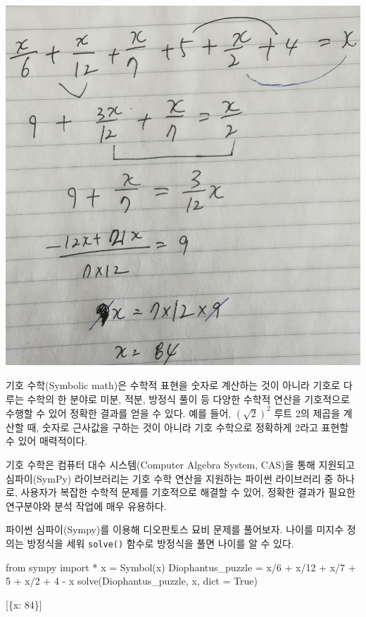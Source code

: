 \documentclass[
  letterpaper,
]{book}
\newenvironment{Shaded}{\begin{snugshade}}{\end{snugshade}}
\newcommand{\BuiltInTok}[1]{\textcolor[rgb]{0.00,0.23,0.31}{#1}}
\newcommand{\DecValTok}[1]{\textcolor[rgb]{0.68,0.00,0.00}{#1}}
\newcommand{\ImportTok}[1]{\textcolor[rgb]{0.00,0.46,0.62}{#1}}
\newcommand{\NormalTok}[1]{\textcolor[rgb]{0.00,0.23,0.31}{#1}}
\newcommand{\OperatorTok}[1]{\textcolor[rgb]{0.37,0.37,0.37}{#1}}
\newcommand{\StringTok}[1]{\textcolor[rgb]{0.13,0.47,0.30}{#1}}
\newcommand{\VariableTok}[1]{\textcolor[rgb]{0.07,0.07,0.07}{#1}}
\begin{document}
\includegraphics{images/inference_hand.jpg}

기호 수학(Symbolic math)은 수학적 표현을 숫자로 계산하는 것이 아니라
기호로 다루는 수학의 한 분야로 미분, 적분, 방정식 풀이 등 다양한 수학적
연산을 기호적으로 수행할 수 있어 정확한 결과를 얻을 수 있다. 예를 들어,
\((\sqrt{2})^2\) 루트 2의 제곱을 계산할 때, 숫자로 근사값을 구하는 것이
아니라 기호 수학으로 정확하게 2라고 표현할 수 있어 매력적이다.

기호 수학은 컴퓨터 대수 시스템(Computer Algebra System, CAS)을 통해
지원되고 심파이(SymPy) 라이브러리는 기호 수학 연산을 지원하는 파이썬
라이브러리 중 하나로, 사용자가 복잡한 수학적 문제를 기호적으로 해결할 수
있어, 정확한 결과가 필요한 연구분야와 분석 작업에 매우 유용하다.

파이썬 심파이(Sympy)를 이용해 디오판토스 묘비 문제를 풀어보자. 나이를
미지수 정의는 방정식을 세워 \texttt{solve()} 함수로 방정식을 풀면 나이를
알 수 있다.

\begin{Shaded}
\begin{Highlighting}[]
\ImportTok{from}\NormalTok{ sympy }\ImportTok{import} \OperatorTok{*}
\NormalTok{x }\OperatorTok{=}\NormalTok{ Symbol(}\StringTok{\textquotesingle{}x\textquotesingle{}}\NormalTok{)}
\NormalTok{Diophantus\_puzzle }\OperatorTok{=}\NormalTok{ x}\OperatorTok{/}\DecValTok{6} \OperatorTok{+}\NormalTok{ x}\OperatorTok{/}\DecValTok{12} \OperatorTok{+}\NormalTok{ x}\OperatorTok{/}\DecValTok{7} \OperatorTok{+} \DecValTok{5} \OperatorTok{+}\NormalTok{ x}\OperatorTok{/}\DecValTok{2} \OperatorTok{+} \DecValTok{4} \OperatorTok{{-}}\NormalTok{ x}
\NormalTok{solve(Diophantus\_puzzle, x, }\BuiltInTok{dict} \OperatorTok{=} \VariableTok{True}\NormalTok{)}

\NormalTok{[\{x: }\DecValTok{84}\NormalTok{\}]}
\end{Highlighting}
\end{Shaded}
\end{document}
